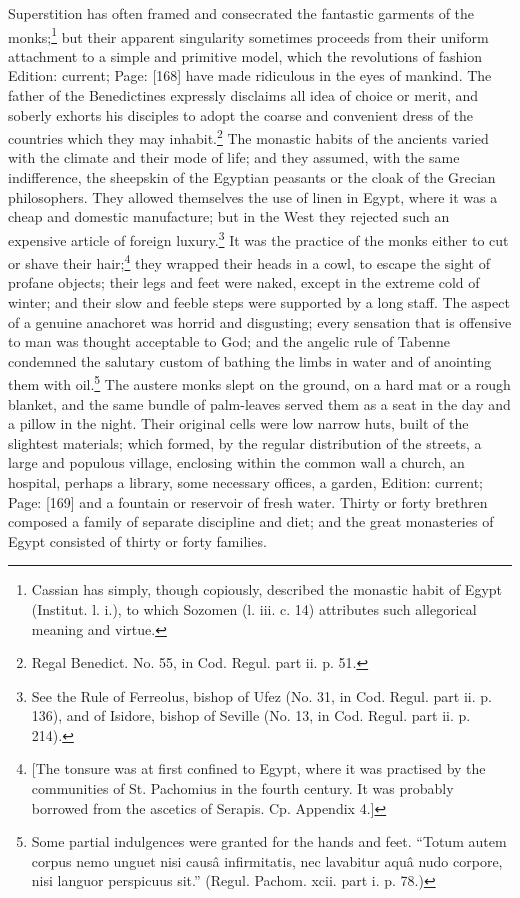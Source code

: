Superstition has often framed and consecrated the fantastic garments of the monks;\footnote{Cassian has simply, though copiously, described the monastic habit of Egypt (Institut. l. i.), to which Sozomen (l. iii. c. 14) attributes such allegorical meaning and virtue.} but their apparent singularity sometimes proceeds from their uniform attachment to a simple and primitive model, which the revolutions of fashion Edition: current; Page: [168] have made ridiculous in the eyes of mankind. The father of the Benedictines expressly disclaims all idea of choice or merit, and soberly exhorts his disciples to adopt the coarse and convenient dress of the countries which they may inhabit.\footnote{Regal Benedict. No. 55, in Cod. Regul. part ii. p. 51.} The monastic habits of the ancients varied with the climate and their mode of life; and they assumed, with the same indifference, the sheepskin of the Egyptian peasants or the cloak of the Grecian philosophers. They allowed themselves the use of linen in Egypt, where it was a cheap and domestic manufacture; but in the West they rejected such an expensive article of foreign luxury.\footnote{See the Rule of Ferreolus, bishop of Ufez (No. 31, in Cod. Regul. part ii. p. 136), and of Isidore, bishop of Seville (No. 13, in Cod. Regul. part ii. p. 214).} It was the practice of the monks either to cut or shave their hair;\footnote{[The tonsure was at first confined to Egypt, where it was practised by the communities of St. Pachomius in the fourth century. It was probably borrowed from the ascetics of Serapis. Cp. Appendix 4.]} they wrapped their heads in a cowl, to escape the sight of profane objects; their legs and feet were naked, except in the extreme cold of winter; and their slow and feeble steps were supported by a long staff. The aspect of a genuine anachoret was horrid and disgusting; every sensation that is offensive to man was thought acceptable to God; and the angelic rule of Tabenne condemned the salutary custom of bathing the limbs in water and of anointing them with oil.\footnote{Some partial indulgences were granted for the hands and feet. \texthebrew{“}Totum autem corpus nemo unguet nisi causâ infirmitatis, nec lavabitur aquâ nudo corpore, nisi languor perspicuus sit.\texthebrew{}” (Regul. Pachom. xcii. part i. p. 78.)} The austere monks slept on the ground, on a hard mat or a rough blanket, and the same bundle of palm-leaves served them as a seat in the day and a pillow in the night. Their original cells were low narrow huts, built of the slightest materials; which formed, by the regular distribution of the streets, a large and populous village, enclosing within the common wall a church, an hospital, perhaps a library, some necessary offices, a garden, Edition: current; Page: [169] and a fountain or reservoir of fresh water. Thirty or forty brethren composed a family of separate discipline and diet; and the great monasteries of Egypt consisted of thirty or forty families.

